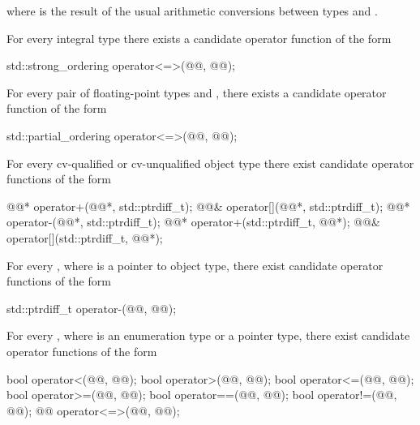 where
is the result of the usual arithmetic conversions between types
and
.

\pnum
For every integral type 
there exists a candidate operator function of the form

\begin{codeblock}
std::strong_ordering operator<=>(@@, @@);
\end{codeblock}

\pnum
For every pair of floating-point types
 and ,
there exists a candidate operator function of the form

\begin{codeblock}
std::partial_ordering operator<=>(@@, @@);
\end{codeblock}

\pnum
For every cv-qualified or cv-unqualified object type
there exist candidate operator functions of the form

\begin{codeblock}
@@*      operator+(@@*, std::ptrdiff_t);
@@&      operator[](@@*, std::ptrdiff_t);
@@*      operator-(@@*, std::ptrdiff_t);
@@*      operator+(std::ptrdiff_t, @@*);
@@&      operator[](std::ptrdiff_t, @@*);
\end{codeblock}

\pnum
For every
,
where
is a pointer to object type,
there exist candidate operator functions of the form

\begin{codeblock}
std::ptrdiff_t   operator-(@@, @@);
\end{codeblock}

\pnum
For every , where  is an enumeration type or a pointer type,
there exist candidate operator functions of the form

\begin{codeblock}
bool    operator<(@@, @@);
bool    operator>(@@, @@);
bool    operator<=(@@, @@);
bool    operator>=(@@, @@);
bool    operator==(@@, @@);
bool    operator!=(@@, @@);
@@       operator<=>(@@, @@);
\end{codeblock}

